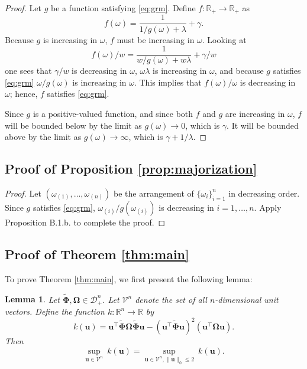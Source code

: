 \documentclass[12pt]{article}
\newtheorem{lemma}{Lemma}
\newcommand{\bl}[1]{{\mathbf #1}}
\newcommand{\bs}[1]{\boldsymbol #1}
\begin{document}
\begin{proof}
    Let $g$ be a function satisfying \eqref{eq:grm}. Define $f : \mathbb{R}_+ \rightarrow \mathbb{R}_+$ as
    \begin{equation*}
        f(\omega) = \frac{1}{1/g(\omega) + \lambda} + \gamma.
    \end{equation*}
    Because $g$ is increasing in $\omega$, $f$ must be increasing in $\omega$. Looking at
    \begin{equation*}
        f(\omega)/w = \frac{1}{w/g(\omega) + w\lambda} + \gamma/w
    \end{equation*}
    one sees that $\gamma/w$ is decreasing in $\omega$, $\omega \lambda$ is increasing in $\omega$, and because $g$ satisfies \eqref{eq:grm} $\omega / g(\omega)$ is increasing in $\omega$. This implies that $f(\omega)/\omega$ is decreasing in $\omega$; hence, $f$ satisfies \eqref{eq:grm}.

    Since $g$ is a positive-valued function, and since both $f$ and $g$ are increasing in $\omega$, $f$ will be bounded below by the limit as $g(\omega) \rightarrow 0$, which is $\gamma$. It will be bounded above by the limit as $g(\omega) \rightarrow \infty$, which is $\gamma + 1/\lambda$.
\end{proof}

\subsection{{Proof of Proposition \ref{prop:majorization}}}

\begin{proof}
    Let $(\omega_{(1)}, \dots, \omega_{(n)})$ be the arrangement of $\{\omega_i\}_{i=1}^n$ in decreasing order. Since $g$ satisfies \eqref{eq:grm}, $\omega_{(i)} / g(\omega_{(i)})$ is decreasing in $i = 1, \dots, n$. Apply \cite{marshall_inequalities_2011} Proposition B.1.b. to complete the proof.
\end{proof}

\subsection{{Proof of Theorem \ref{thm:main}}}
To prove Theorem \ref{thm:main}, we first present the following lemma:
\begin{lemma}\label{lem:zeros}
Let $\tilde{\bs{\Phi}}, \bs{\Omega} \in \mathcal{D}_+^n$. Let $\mathcal{V}^n$ denote the set of all $n$-dimensional unit vectors. Define the function $k : \mathbb{R}^n \rightarrow \mathbb{R}$ by
\begin{equation*}
    k(\bl{u}) = \bl{u}^\top \tilde{\bs{\Phi}} \bs{\Omega} \tilde{\bs{\Phi}} \bl{u} - (\bl{u}^\top \tilde{\bs{\Phi}} \bl{u})^2 (\bl{u}^\top \bs{\Omega} \bl{u}).
\end{equation*}
Then
\begin{equation*}
    \sup_{\bl{u} \in \mathcal{V}^n}~k(\bl{u}) = \sup_{\bl{u} \in \mathcal{V}^n, \|\bl{u}\|_0 \leq 2}~k(\bl{u}).
\end{equation*}
\end{lemma}
\end{document}
